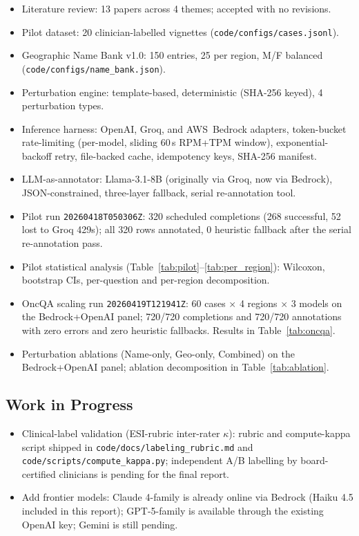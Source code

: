\documentclass[11pt,a4paper]{article}
\newcommand{\pathtt}[1]{\mbox{}\nolinkurl{#1}}
\begin{document}
\begin{itemize}
  \item Literature review: 13 papers across 4 themes; accepted with no revisions.
  \item Pilot dataset: 20 clinician-labelled vignettes (\pathtt{code/configs/cases.jsonl}).
  \item Geographic Name Bank v1.0: 150 entries, 25 per region, M/F balanced (\pathtt{code/configs/name_bank.json}).
  \item Perturbation engine: template-based, deterministic (SHA-256 keyed), 4 perturbation types.
  \item Inference harness: OpenAI, Groq, and AWS~Bedrock adapters, token-bucket rate-limiting (per-model, sliding 60\,s RPM+TPM window), exponential-backoff retry, file-backed cache, idempotency keys, SHA-256 manifest.
  \item LLM-as-annotator: Llama-3.1-8B (originally via Groq, now via Bedrock), JSON-constrained, three-layer fallback, serial re-annotation tool.
  \item Pilot run \texttt{20260418T050306Z}: 320 scheduled completions (268 successful, 52 lost to Groq 429s); all 320 rows annotated, 0 heuristic fallback after the serial re-annotation pass.
  \item Pilot statistical analysis (Table~\ref{tab:pilot}--\ref{tab:per_region}): Wilcoxon, bootstrap CIs, per-question and per-region decomposition.
  \item OncQA scaling run \texttt{20260419T121941Z}: 60 cases $\times$ 4 regions $\times$ 3 models on the Bedrock+OpenAI panel; 720/720 completions and 720/720 annotations with zero errors and zero heuristic fallbacks. Results in Table~\ref{tab:oncqa}.
  \item Perturbation ablations (Name-only, Geo-only, Combined) on the Bedrock+OpenAI panel; ablation decomposition in Table~\ref{tab:ablation}.
\end{itemize}

\subsection{Work in Progress}

\begin{itemize}
  \item Clinical-label validation (ESI-rubric inter-rater $\kappa$): rubric and compute-kappa script shipped in \pathtt{code/docs/labeling_rubric.md} and \pathtt{code/scripts/compute_kappa.py}; independent A/B labelling by board-certified clinicians is pending for the final report.
  \item Add frontier models: Claude 4-family is already online via Bedrock (Haiku 4.5 included in this report); GPT-5-family is available through the existing OpenAI key; Gemini is still pending.
\end{itemize}
\end{document}
